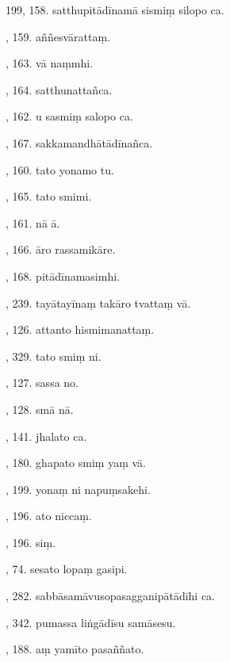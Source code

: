 199, 158. satthupitādīnamā sismiṃ silopo ca.\hfill \pageref{sut:199}\par {}, 159. aññesvārattaṃ.\hfill \pageref{sut:200}\par {}, 163. vā naṃmhi.\hfill \pageref{sut:201}\par {}, 164. satthunattañca.\hfill \pageref{sut:202}\par {}, 162. u sasmiṃ salopo ca.\hfill \pageref{sut:203}\par {}, 167. sakkamandhātādīnañca.\hfill \pageref{sut:204}\par {}, 160. tato yonamo tu.\hfill \pageref{sut:205}\par {}, 165. tato smimi.\hfill \pageref{sut:206}\par {}, 161. nā ā.\hfill \pageref{sut:207}\par {}, 166. āro rassamikāre.\hfill \pageref{sut:208}\par {}, 168. pitādīnamasimhi.\hfill \pageref{sut:209}\par {}, 239. tayātayīnaṃ takāro tvattaṃ vā.\hfill \pageref{sut:210}\par {}, 126. attanto hismimanattaṃ.\hfill \pageref{sut:211}\par {}, 329. tato smiṃ ni.\hfill \pageref{sut:212}\par {}, 127. sassa no.\hfill \pageref{sut:213}\par {}, 128. smā nā.\hfill \pageref{sut:214}\par {}, 141. jhalato ca.\hfill \pageref{sut:215}\par {}, 180. ghapato smiṃ yaṃ vā.\hfill \pageref{sut:216}\par {}, 199. yonaṃ ni napuṃsakehi.\hfill \pageref{sut:217}\par {}, 196. ato niccaṃ.\hfill \pageref{sut:218}\par {}, 196. siṃ.\hfill \pageref{sut:219}\par {}, 74. sesato lopaṃ gasipi.\hfill \pageref{sut:220}\par {}, 282. sabbāsamāvusopasagganipātādīhi ca.\hfill \pageref{sut:221}\par {}, 342. pumassa liṅgādīsu samāsesu.\hfill \pageref{sut:222}\par {}, 188. aṃ yamīto pasaññato.\hfill \pageref{sut:223}\par \noindent
